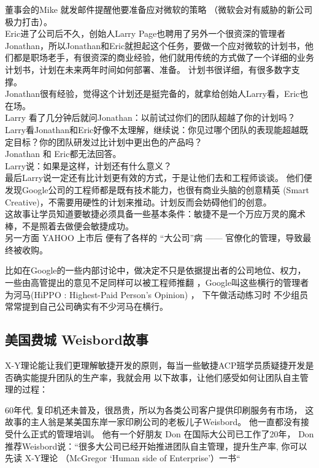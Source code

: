 董事会的Mike 就发邮件提醒他要准备应对微软的策略
（微软会对有威胁的新公司极力打击）。\\
Eric进了公司后不久，创始人Larry
Page也聘用了另外一个很资深的管理者Jonathan，所以Jonathan和Eric就担起这个任务，要做一个应对微软的计划书，他们都是职场老手，有很资深的商业经验，他们就用传统的方式做了一个详细的业务计划书，计划在未来两年时间如何部署、准备。
计划书很详细，有很多数字支撑。\\
Jonathan很有经验，觉得这个计划还是挺完备的，就拿给创始人Larry看，Eric也在场。\\
Larry 看了几分钟后就问Jonathan：以前试过你们的团队超越了你的计划吗？\\
Larry看Jonathan和Eric好像不太理解，继续说：你见过哪个团队的表现能超越既定目标？你的团队研发过比计划中更出色的产品吗？\\
Jonathan 和 Eric都无法回答。\\
Larry说：如果是这样，计划还有什么意义？\\
最后Larry说一定还有比计划更有效的方式，于是让他们去和工程师谈谈。
他们便发现Google公司的工程师都是既有技术能力，也很有商业头脑的创意精英
(Smart Creative)，不需要用硬性的计划来推动。计划反而会妨碍他们的创意。\\
这故事让学员知道要敏捷必须具备一些基本条件：敏捷不是一个万应万灵的魔术棒，不是照着去做便会敏捷成功。\\
另一方面 YAHOO 上市后 便有了各样的 ``大公司''病 ------
官僚化的管理，导致最终被收购。

比如在Google的一些内部讨论中，做决定不只是依据提出者的公司地位、权力，
一些由高管提出的意见不足同样可以被工程师推翻
，Google叫这些横行的管理者为河马(HiPPO : Highest-Paid Person's Opinion)
， 下午做活动练习时 不少组员 常常提到自己公司确实有不少河马在横行。

\hypertarget{ux7f8eux56fdux8d39ux57ce-weisbordux6545ux4e8b}{%
\subsection{美国费城
Weisbord故事}\label{ux7f8eux56fdux8d39ux57ce-weisbordux6545ux4e8b}}

X-Y理论能让我们更理解敏捷开发的原则，每当一些敏捷ACP班学员质疑捷开发是否确实能提升团队的生产率，我就会用
以下故事，让他们感受如何让团队自主管理的过程：

60年代, 复印机还未普及，很昂贵，所以为各类公司客户提供印刷服务有市场，
这故事的主人翁是某美国东岸一家印刷公司的老板儿子Weisbord。
他一直都没有接受什么正式的管理培训。 他有一个好朋友 Don
在国际大公司已工作了20年，
Don推荐Weisbord说：``很多大公司已经开始推进团队自主管理，提升生产率,
你可以先读 X-Y理论 （McGregor `Human side of Enterprise'）一书``

